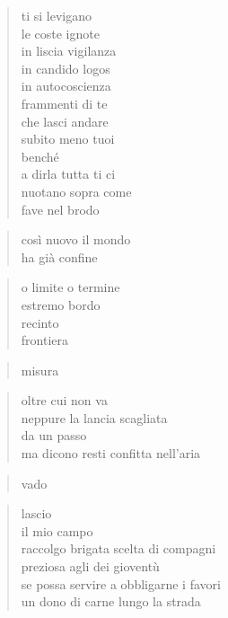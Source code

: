 	\begin{verse}
		ti si levigano\\
		le coste ignote\\
		in liscia vigilanza\\
		in candido logos\\
		in autocoscienza\\
		frammenti di te\\
		che lasci andare\\
		subito meno tuoi\\
		benché\\
		a dirla tutta ti ci\\
		nuotano sopra come\\
		fave nel brodo
	\end{verse}


\clearpage



	\begin{verse}
		così nuovo il mondo\\
		ha già confine
	\end{verse}

	\begin{verse}
		o limite o termine\\
		estremo bordo\\
		recinto\\
		frontiera
	\end{verse}

	\begin{verse}
		misura
	\end{verse}

	\begin{verse}
		oltre cui non va\\
		neppure la lancia scagliata\\
		da un passo\\
		ma dicono resti confitta nell’aria
	\end{verse}

	\begin{verse}
		vado
	\end{verse}

	\begin{verse}
		lascio\\
		il mio campo\\
		raccolgo brigata scelta di compagni\\
		preziosa agli dei gioventù\\
		se possa servire a obbligarne i favori\\
		un dono di carne lungo la strada
	\end{verse}

